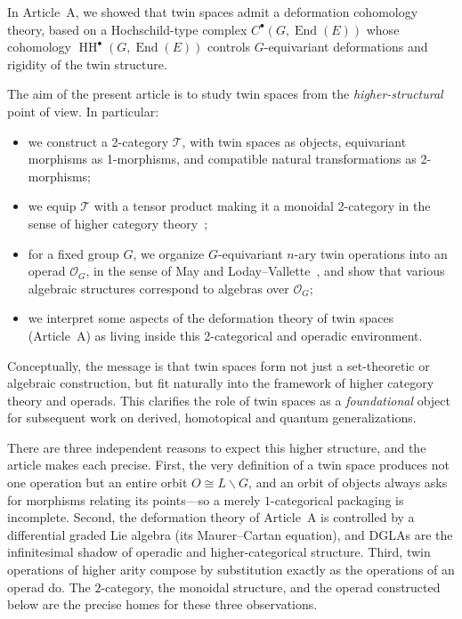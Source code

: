 \documentclass[11pt,a4paper]{article}
\numberwithin{equation}{section}
\DeclareMathOperator{\End}{End}
\DeclareMathOperator{\HH}{HH}
\newcommand{\Twin}{\mathcal{T}}
\newcommand{\TwinOrbit}{O}
\newcommand{\LinearSubgroup}{L}
\newcommand{\Cochain}{C}
\begin{document}
	In Article~A, we showed that twin spaces admit a deformation cohomology theory, based on a Hochschild-type
	complex $\Cochain^\bullet(G,\End(E))$ whose cohomology $\HH^\bullet(G,\End(E))$ controls $G$-equivariant
	deformations and rigidity of the twin structure.
	
	The aim of the present article is to study twin spaces from the \emph{higher-structural} point of view.
	In particular:
	
	\begin{itemize}
		\item we construct a 2-category $\Twin$, with twin spaces as objects, equivariant morphisms as 1-morphisms,
		and compatible natural transformations as 2-morphisms;
		\item we equip $\Twin$ with a tensor product making it a monoidal 2-category in the sense of 
		higher category theory~\cite{MacLane1998,Leinster2004,Kelly1982};
		\item for a fixed group $G$, we organize $G$-equivariant $n$-ary twin operations into an operad
		$\mathcal{O}_G$, in the sense of May and Loday--Vallette~\cite{May1972,LodayVallette2012}, and show that various
		algebraic structures correspond to algebras over $\mathcal{O}_G$;
		\item we interpret some aspects of the deformation theory of twin spaces (Article~A) as living inside
		this 2-categorical and operadic environment.
	\end{itemize}
	
	Conceptually, the message is that twin spaces form not just a set-theoretic or algebraic construction,
	but fit naturally into the framework of higher category theory and operads.
	This clarifies the role of twin spaces as a \emph{foundational} object for subsequent work on 
	derived, homotopical and quantum generalizations.

	There are three independent reasons to expect this higher structure, and the article makes each precise.
	First, the very definition of a twin space produces not one operation but an entire orbit
	$\TwinOrbit\cong\LinearSubgroup\backslash G$, and an orbit of objects always asks for morphisms relating its
	points---so a merely $1$-categorical packaging is incomplete. Second, the deformation theory of Article~A is
	controlled by a differential graded Lie algebra (its Maurer--Cartan equation), and DGLAs are the infinitesimal
	shadow of operadic and higher-categorical structure. Third, twin operations of higher arity compose by
	substitution exactly as the operations of an operad do. The $2$-category, the monoidal structure, and the
	operad constructed below are the precise homes for these three observations.
	
\end{document}
